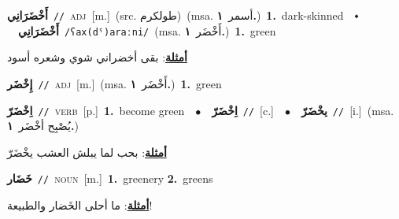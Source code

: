 \documentclass[10pt,a4paper,twoside]{article} %
\begin{document}
\begin{multicols}{2}
{\setlength\topsep{0pt}\textbf{\foreignlanguage{arabic}{أَخْضَرَانِي}}\ {\color{gray}\texttt{//}\color{black}}\ \textsc{adj}\ [m.]\ (src. \color{gray}\foreignlanguage{arabic}{طولكرم}\color{black})\ \color{gray}(msa. \foreignlanguage{arabic}{أسمر}~\foreignlanguage{arabic}{\textbf{١.}})\color{black}\ \textbf{1.}~dark-skinned\ \ $\smblkdiamond$\ \ \setlength\topsep{0pt}\textbf{\foreignlanguage{arabic}{أَخْضَرَانِي}}\ {\color{gray}\texttt{/ʕax(dˤ)araːni/}\color{black}}\ \color{gray}(msa. \foreignlanguage{arabic}{أَخْضَر}~\foreignlanguage{arabic}{\textbf{١.}})\color{black}\ \textbf{1.}~green\  \begin{flushright}\color{gray}\foreignlanguage{arabic}{\textbf{\underline{\foreignlanguage{arabic}{أمثلة}}}: بقى أخضراني شوي وشعره أسود}\end{flushright}\color{black}} \vspace{2mm}

{\setlength\topsep{0pt}\textbf{\foreignlanguage{arabic}{إِخْضَر}}\ {\color{gray}\texttt{//}\color{black}}\ \textsc{adj}\ [m.]\ \color{gray}(msa. \foreignlanguage{arabic}{أَخْضَر}~\foreignlanguage{arabic}{\textbf{١.}})\color{black}\ \textbf{1.}~green\ } \vspace{2mm}

{\setlength\topsep{0pt}\textbf{\foreignlanguage{arabic}{اِخْضَرّ}}\ {\color{gray}\texttt{//}\color{black}}\ \textsc{verb}\ [p.]\ \textbf{1.}~become green\ \ $\bullet$\ \ \setlength\topsep{0pt}\textbf{\foreignlanguage{arabic}{اِخْضَرّ}}\ {\color{gray}\texttt{//}\color{black}}\ [c.]\ \ $\bullet$\ \ \setlength\topsep{0pt}\textbf{\foreignlanguage{arabic}{يخْضَرّ}}\ {\color{gray}\texttt{//}\color{black}}\ [i.]\ \color{gray}(msa. \foreignlanguage{arabic}{يُصْبِح أخْضَر}~\foreignlanguage{arabic}{\textbf{١.}})\color{black}\  \begin{flushright}\color{gray}\foreignlanguage{arabic}{\textbf{\underline{\foreignlanguage{arabic}{أمثلة}}}: بحب لما يبلش العشب يخْضَرّ}\end{flushright}\color{black}} \vspace{2mm}

{\setlength\topsep{0pt}\textbf{\foreignlanguage{arabic}{خَضَار}}\ {\color{gray}\texttt{//}\color{black}}\ \textsc{noun}\ [m.]\ \textbf{1.}~greenery  \textbf{2.}~greens\  \begin{flushright}\color{gray}\foreignlanguage{arabic}{\textbf{\underline{\foreignlanguage{arabic}{أمثلة}}}: ما أحلى الخَضار والطبيعة!}\end{flushright}\color{black}} \vspace{2mm}


\end{multicols}
\end{document}
